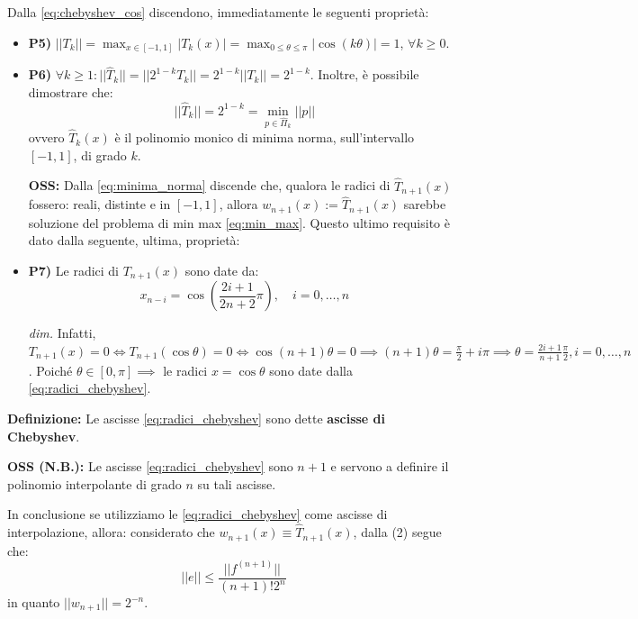 Dalla \eqref{eq:chebyshev_cos} discendono, immediatamente le seguenti proprietà:
\begin{itemize}
    \item \textbf{P5)} $||T_k|| = \max_{x \in [-1,1]} |T_k(x)| = \max_{0 \le \theta \le \pi} |\cos(k\theta)| = 1$, $\forall k \ge 0$.
    \item \textbf{P6)} $\forall k \ge 1 : ||\hat{T}_k|| = ||2^{1-k} T_k|| = 2^{1-k} ||T_k|| = 2^{1-k}$. 
    Inoltre, è possibile dimostrare che:
    \begin{equation} \label{eq:minima_norma}
    ||\hat{T}_k|| = 2^{1-k} = \min_{p \in \hat{\Pi}_k} ||p||
    \end{equation}
    ovvero $\hat{T}_k(x)$ è il polinomio monico di minima norma, sull'intervallo $[-1,1]$, di grado $k$.
    
    \textbf{OSS:} Dalla \eqref{eq:minima_norma} discende che, qualora le radici di $\hat{T}_{n+1}(x)$ fossero: reali, distinte e in $[-1,1]$, allora $w_{n+1}(x) := \hat{T}_{n+1}(x)$ sarebbe soluzione del problema di min max \eqref{eq:min_max}.
    Questo ultimo requisito è dato dalla seguente, ultima, proprietà:
    
    \item \textbf{P7)} Le radici di $T_{n+1}(x)$ sono date da:
    \begin{equation} \label{eq:radici_chebyshev}
    x_{n-i} = \cos \left( \frac{2i+1}{2n+2}\pi \right), \quad i=0, \dots, n
    \end{equation}
    
    \textit{dim.} Infatti, $T_{n+1}(x) = 0 \iff T_{n+1}(\cos \theta) = 0 \iff \cos(n+1)\theta = 0 \implies (n+1)\theta = \frac{\pi}{2} + i\pi \implies \theta = \frac{2i+1}{n+1} \frac{\pi}{2}, i=0, \dots, n$. Poiché $\theta \in [0,\pi] \implies$ le radici $x = \cos \theta$ sono date dalla \eqref{eq:radici_chebyshev}.
\end{itemize}

\textbf{Definizione:} Le ascisse \eqref{eq:radici_chebyshev} sono dette \textbf{ascisse di Chebyshev}.

\vspace{0.5cm}
\textbf{OSS (N.B.):} Le ascisse \eqref{eq:radici_chebyshev} sono $n+1$ e servono a definire il polinomio interpolante di grado $n$ su tali ascisse.

In conclusione se utilizziamo le \eqref{eq:radici_chebyshev} come ascisse di interpolazione, allora: considerato che $w_{n+1}(x) \equiv \hat{T}_{n+1}(x)$, dalla (2) segue che:
$$ ||e|| \le \frac{||f^{(n+1)}||}{(n+1)! 2^n} $$
in quanto $||w_{n+1}|| = 2^{-n}$.

